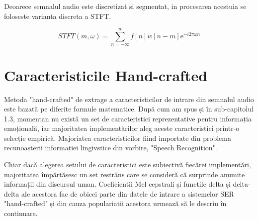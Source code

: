 \documentclass[a4paper,12pt]{book}
\begin{document}
			Deoarece semnalul audio este discretizat si segmentat, in procesarea acestuia se foloseste varianta discreta a STFT.
			
			\begin{equation}
			STFT(m ,\omega) = \sum_{n=-\infty}^{\infty}  f[n] w[n-m]\mathrm{e}^{- i 2\pi \omega n}  \label{stft}
			\end{equation}
			
			
			\section{Caracteristicile Hand-crafted} \label{hand-crafted}
			
			Metoda "hand-crafted" de extrage a caracteristicilor de intrare din semnalul audio este bazată pe diferite formule matematice. După cum am spus și în sub-capitolul 1.3, momentan nu există un set de caracteristici reprezentative pentru informația emoțională, iar majoritatea implementărilor aleg aceste caracteristici printr-o selecție empirică. Majoriatea caracteristicilor fiind importate din problema recunoașterii informației lingivstice din vorbire, "Speech Recognition". \par 
			Chiar dacă alegerea setului de caracteristici este subiectivă fiecărei implementări, majoritatea împărtășesc un set restrâns care se consideră că surprinde anumite informații din discursul uman. Coeficientii Mel cepstrali și functile delta și delta-delta ale acestora fac de obicei parte din datele de intrare a sistemelor SER "hand-crafted" și din cauza populariatii acestora urmează să le descriu în continuare. \par
			
\end{document}
